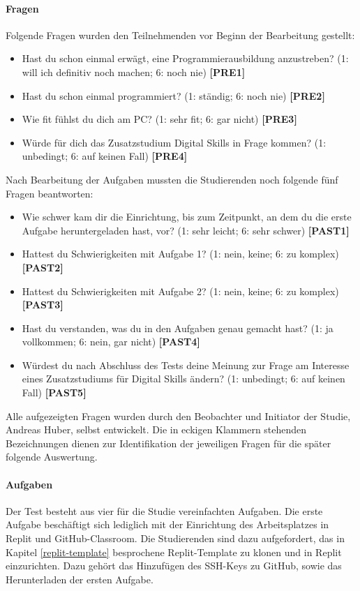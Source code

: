 \paragraph{Fragen}
Folgende Fragen wurden den Teilnehmenden vor Beginn der Bearbeitung gestellt:

\begin{itemize}
    \item Hast du schon einmal erwägt, eine Programmierausbildung anzustreben?
    (1: will ich definitiv noch machen; 6: noch nie) \textbf{[PRE1]}
    \item Hast du schon einmal programmiert? (1: ständig; 6: noch nie)
    \textbf{[PRE2]}
    \item Wie fit fühlst du dich am PC? (1: sehr fit; 6: gar nicht)
    \textbf{[PRE3]}
    \item Würde für dich das Zusatzstudium Digital Skills in Frage kommen?
    (1: unbedingt; 6: auf keinen Fall) \textbf{[PRE4]}
\end{itemize}

Nach Bearbeitung der Aufgaben mussten die Studierenden noch folgende fünf
Fragen beantworten:

\begin{itemize}
    \item Wie schwer kam dir die Einrichtung, bis zum Zeitpunkt, an dem du die
    erste Aufgabe heruntergeladen hast, vor? (1: sehr leicht; 6: sehr schwer)
    \textbf{[PAST1]}
    \item Hattest du Schwierigkeiten mit Aufgabe 1? (1: nein, keine; 6: zu
    komplex) \textbf{[PAST2]}
    \item Hattest du Schwierigkeiten mit Aufgabe 2? (1: nein, keine; 6: zu
    komplex) \textbf{[PAST3]}
    \item Hast du verstanden, was du in den Aufgaben genau gemacht hast? (1: ja
    vollkommen; 6: nein, gar nicht) \textbf{[PAST4]}
    \item Würdest du nach Abschluss des Tests deine Meinung zur Frage am
    Interesse eines Zusatzstudiums für Digital Skills ändern? (1: unbedingt;
    6: auf keinen Fall) \textbf{[PAST5]}
\end{itemize}

Alle aufgezeigten Fragen wurden durch den Beobachter und Initiator der Studie,
Andreas Huber, selbst entwickelt. Die in eckigen Klammern stehenden
Bezeichnungen dienen zur Identifikation der jeweiligen Fragen für die später
folgende Auswertung.

\paragraph{Aufgaben}
Der Test besteht aus vier für die Studie vereinfachten Aufgaben. Die erste
Aufgabe beschäftigt sich lediglich mit der Einrichtung des Arbeitsplatzes in
Replit und GitHub-Classroom. Die Studierenden sind dazu aufgefordert, das in 
Kapitel \ref{replit-template} besprochene Replit-Template zu klonen und in 
Replit einzurichten. Dazu gehört das Hinzufügen des SSH-Keys zu GitHub, sowie
das Herunterladen der ersten Aufgabe.  \parencite{git-repo:replit-template}

